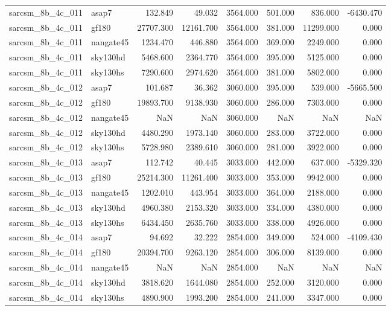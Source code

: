 \begin{tabular}{llrrrrrr}
sarcsm\_8b\_4c\_011 & asap7 & 132.849 & 49.032 & 3564.000 & 501.000 & 836.000 & -6430.470 \\
sarcsm\_8b\_4c\_011 & gf180 & 27707.300 & 12161.700 & 3564.000 & 381.000 & 11299.000 & 0.000 \\
sarcsm\_8b\_4c\_011 & nangate45 & 1234.470 & 446.880 & 3564.000 & 369.000 & 2249.000 & 0.000 \\
sarcsm\_8b\_4c\_011 & sky130hd & 5468.600 & 2364.770 & 3564.000 & 395.000 & 5125.000 & 0.000 \\
sarcsm\_8b\_4c\_011 & sky130hs & 7290.600 & 2974.620 & 3564.000 & 381.000 & 5802.000 & 0.000 \\
sarcsm\_8b\_4c\_012 & asap7 & 101.687 & 36.362 & 3060.000 & 395.000 & 539.000 & -5665.500 \\
sarcsm\_8b\_4c\_012 & gf180 & 19893.700 & 9138.930 & 3060.000 & 286.000 & 7303.000 & 0.000 \\
sarcsm\_8b\_4c\_012 & nangate45 & NaN & NaN & 3060.000 & NaN & NaN & NaN \\
sarcsm\_8b\_4c\_012 & sky130hd & 4480.290 & 1973.140 & 3060.000 & 283.000 & 3722.000 & 0.000 \\
sarcsm\_8b\_4c\_012 & sky130hs & 5728.980 & 2389.610 & 3060.000 & 281.000 & 3922.000 & 0.000 \\
sarcsm\_8b\_4c\_013 & asap7 & 112.742 & 40.445 & 3033.000 & 442.000 & 637.000 & -5329.320 \\
sarcsm\_8b\_4c\_013 & gf180 & 25214.300 & 11261.400 & 3033.000 & 353.000 & 9942.000 & 0.000 \\
sarcsm\_8b\_4c\_013 & nangate45 & 1202.010 & 443.954 & 3033.000 & 364.000 & 2188.000 & 0.000 \\
sarcsm\_8b\_4c\_013 & sky130hd & 4960.380 & 2153.320 & 3033.000 & 334.000 & 4380.000 & 0.000 \\
sarcsm\_8b\_4c\_013 & sky130hs & 6434.450 & 2635.760 & 3033.000 & 338.000 & 4926.000 & 0.000 \\
sarcsm\_8b\_4c\_014 & asap7 & 94.692 & 32.222 & 2854.000 & 349.000 & 524.000 & -4109.430 \\
sarcsm\_8b\_4c\_014 & gf180 & 20394.700 & 9263.120 & 2854.000 & 306.000 & 8139.000 & 0.000 \\
sarcsm\_8b\_4c\_014 & nangate45 & NaN & NaN & 2854.000 & NaN & NaN & NaN \\
sarcsm\_8b\_4c\_014 & sky130hd & 3818.620 & 1644.080 & 2854.000 & 252.000 & 3120.000 & 0.000 \\
sarcsm\_8b\_4c\_014 & sky130hs & 4890.900 & 1993.200 & 2854.000 & 241.000 & 3347.000 & 0.000 \\

\end{tabular}
